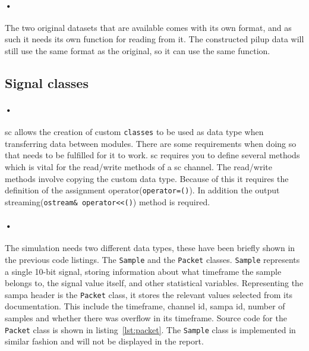 \documentclass[a4paper, 12pt]{report}
\newcommand{\codeword}[1]{\texttt{#1}}
\begin{document}
\paragraph{•}
The two original datasets that are available comes with its own format, and as such it needs its own function for reading from it.
The constructed pilup data will still use the same format as the original, so it can use the same function.


\subsection{Signal classes}
\label{subsec:signal-classes}
\paragraph{•}
\gls{sc} allows the creation of custom \codeword{classes} to be used as data type when transferring data between modules.
There are some requirements when doing so that needs to be fulfilled for it to work.
\gls{sc} requires you to define several methods which is vital for the read/write methods of a \gls{sc} channel.
The read/write methods involve copying the custom data type.
Because of this it requires the definition of the assignment operator(\codeword{operator=()}).
In addition the output streaming(\codeword{ostream\& operator<<()}) method is required. 

\paragraph{•}
The simulation needs two different data types, these have been briefly shown in the previous code listings.
The \codeword{Sample} and the \codeword{Packet} classes.
\codeword{Sample} represents a single 10-bit signal, storing information about what timeframe the sample belongs to, the signal value itself, and other statistical variables.
Representing the \gls{sampa} header is the \codeword{Packet} class, it stores the relevant values selected from its documentation.
This include the timeframe, channel id, sampa id, number of samples and whether there was overflow in its timeframe.
Source code for the \codeword{Packet} class is shown in listing~\ref{lst:packet}.
The \codeword{Sample} class is implemented in similar fashion and will not be displayed in the report. 

\begin{minipage}{\linewidth}

\end{minipage}
\end{document}
